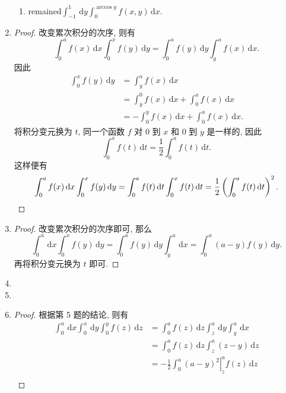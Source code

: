 \begin{enumerate}
\begin{enumerate}[(1)]
            \item %
                {\color{red}remained}$\displaystyle{\int_{-1}^1\,\mathrm{d}y\int_{0}^{\arccos{y}}f(x,y)\,\mathrm{d}x}$.
        \end{enumerate}
    \item %
        \begin{proof}
            改变累次积分的次序, 则有
            \[
                \int_0^af(x)\,\mathrm{d}x\int_0^xf(y)\,\mathrm{d}y = \int_0^af(y)\,\mathrm{d}y\int_y^af(x)\,\mathrm{d}x.   
            \]
            因此
            \begin{align*}
                \int_0^xf(y)\,\mathrm{d}y &= \int_y^af(x)\,\mathrm{d}x \\
                &= \int_y^0f(x)\,\mathrm{d}x + \int_0^af(x)\,\mathrm{d}x \\
                &= -\int_0^yf(x)\,\mathrm{d}x + \int_0^af(x)\,\mathrm{d}x.
            \end{align*}
            将积分变元换为 $t$, 同一个函数 $f$ 对 $0$ 到 $x$ 和 $0$ 到 $y$ 是一样的, 因此
            \[
                \int_0^xf(t)\,\mathrm{d}t = \frac{1}{2}\int_0^af(t)\,\mathrm{d}t.   
            \]
            这样便有
            \[
                \int_0^af(x)\,\mathrm{d}x\int_0^xf(y)\,\mathrm{d}y = \int_0^af(t)\,\mathrm{d}t\int_0^xf(t)\,\mathrm{d}t = \frac12\left(\int_0^af(t)\,\mathrm{d}t\right)^2. \qedhere   
            \]
        \end{proof}
    \item %
        \begin{proof}
            改变累次积分的次序即可, 那么
            \[
                \int_0^a\,\mathrm{d}x\int_0^xf(y)\,\mathrm{d}y = \int_0^af(y)\,\mathrm{d}y\int_y^a\,\mathrm{d}x = \int_0^a(a-y)f(y)\,\mathrm{d}y.   
            \]
            再将积分变元换为 $t$ 即可.
        \end{proof}
    \item %
    \item %
    \item %
        \begin{proof}
            根据第 5 题的结论, 则有
            \begin{align*}
                \int_0^a\,\mathrm{d}x\int_0^x\,\mathrm{d}y\int_0^yf(z)\,\mathrm{d}z &= \int_0^af(z)\,\mathrm{d}z\int_z^a\,\mathrm{d}y\int_y^a\,\mathrm{d}x \\
                &= \int_0^af(z)\,\mathrm{d}z\int_z^a(z-y)\,\mathrm{d}z \\
                &= \left.-\frac12\int_0^a(a-y)^2\right|_z^af(z)\,\mathrm{d}z \\

\end{align*}
\end{proof}
\end{enumerate}
